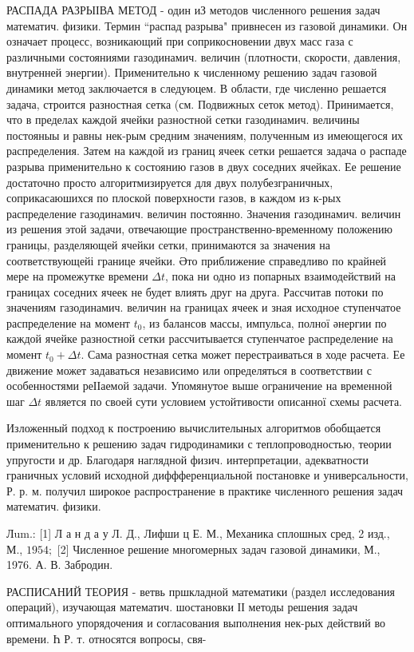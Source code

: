 \documentclass[10pt]{article}
\begin{document}
РАСПАДА РАЗРЫІВА МЕТОД - один иЗ методов численного решения задач математич. физики. Термин “распад разрыва" привнесен из газовой динамики. Он означает процесс, возникающий при соприкосновении двух масс газа с различными состояниями газодинамич. величин (плотности, скорости, давления, внутренней энергии). Применительно к численному решению задач газовой динамики метод заключается в следуюцем. В области, где численно решается задача, строится разностная сетка (см. Подвижных сеток метод). Принимается, что в пределах каждой ячейки разностной сетки газодинамич. величины постояныы и равны нек-рым средним значениям, полученным из имеющегося их распределения. Затем на каждой из границ ячеек сетки решается задача о распаде разрыва применительно к состоянию газов в двух соседних ячейках. Ее решение достаточно просто алгоритмизируется для двух полубезграничных, соприкасаюшихся по плоской поверхности газов, в каждом из к-рых распределение газодинамич. величин постоянно. Значения газодинамич. величин из решения этой задачи, отвечающие пространственно-временному положению границы, разделяющей ячейки сетки, принимаются за значения на соответствующейі границе ячейки. Әто приближение справедливо по крайней мере на промежутке времени $\Delta t$, пока ни одно из попарных взаимодействий на границах соседних ячеек не будет влиять друг на друга. Рассчитав потоки по значениям газодинамич. величин на границах ячеек и зная исходное ступенчатое распределение на момент $t_{0}$, из балансов массы, импульса, полної әнергии по каждой ячейке разностной сетки рассчитывается ступенчатое распределение на момент $t_{0}+\Delta t$. Сама разностная сетка может перестраиваться в ходе расчета. Ее движение может задаваться независимо или определяться в соответствии с особенностями реІІаемой задачи. Упомянутое выше ограничение на временной шаг $\Delta t$ является по своей сути условием устойтивости описанної схемы расчета.



Изложенный подход к построению вычислителыных алгоритмов обобщается применительно к решению задач гидродинамики с теплопроводностью, теории упругости и др. Благодаря наглядной физич. интерпретации, адекватности граничных условий исходной диффференциальной постановке и универсальности, Р. р. м. получил широкое распространение в практике численного решения задач математич. физики.



Лum.: [1] Л а н д а у Л. Д., Лифши ц Е. М., Механика сплошных сред, 2 изд., М., $1954 ;$ [2] Численное решение многомерных задач газовой динамики, М., 1976. А. В. Забродин.



РАСПИСАНИЙ ТЕОРИЯ - ветвь пршкладной математики (раздел исследования операций), изучающая математич. шостановки ІІ методы решения задач оптимального упорядочения и согласования выполнения нек-рых действий во времени. Һ Р. т. относятся вопросы, свя-
\end{document}
